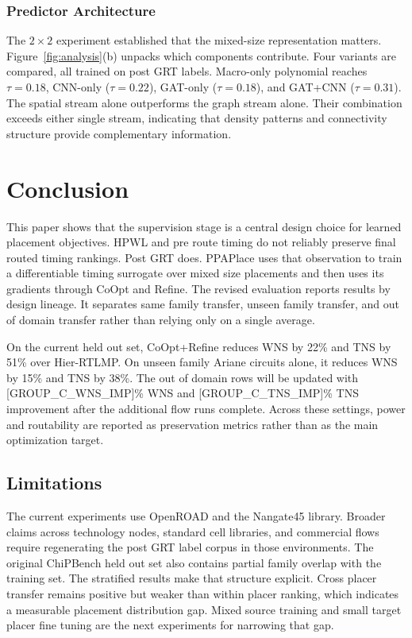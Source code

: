 \documentclass[sigconf,anonymous,review,9pt]{acmart}
\begin{document}
\subsubsection{Predictor Architecture}
\label{subsec:pred_results}

The $2 \times 2$ experiment established that the mixed-size
representation matters. Figure~\ref{fig:analysis}(b) unpacks which
components contribute. Four variants are compared, all trained on
post GRT labels. Macro-only polynomial reaches $\tau = 0.18$, CNN-only
($\tau = 0.22$), GAT-only ($\tau = 0.18$), and GAT+CNN
($\tau = 0.31$). The spatial stream alone outperforms the graph
stream alone. Their combination exceeds either single stream,
indicating that density patterns and connectivity structure provide
complementary information.


\section{Conclusion}
\label{sec:conclusion}

This paper shows that the supervision stage is a central design choice
for learned placement objectives. HPWL and pre route timing do not
reliably preserve final routed timing rankings. Post GRT does. PPAPlace
uses that observation to train a differentiable timing surrogate over
mixed size placements and then uses its gradients through CoOpt and
Refine. The revised evaluation reports results by design lineage. It
separates same family transfer, unseen family transfer, and out of
domain transfer rather than relying only on a single average.

On the current held out set, CoOpt{+}Refine reduces WNS by 22\% and TNS
by 51\% over Hier-RTLMP. On unseen family Ariane circuits alone, it
reduces WNS by 15\% and TNS by 38\%. The out of domain rows will be
updated with [GROUP_C_WNS_IMP]\% WNS and [GROUP_C_TNS_IMP]\% TNS
improvement after the additional flow runs complete. Across these
settings, power and routability are reported as preservation metrics
rather than as the main optimization target.

\subsection{Limitations}
\label{subsec:limitations}

The current experiments use OpenROAD and the Nangate45 library. Broader
claims across technology nodes, standard cell libraries, and commercial
flows require regenerating the post GRT label corpus in those
environments. The original ChiPBench held out set also contains partial
family overlap with the training set. The stratified results make that
structure explicit. Cross placer transfer remains positive but weaker
than within placer ranking, which indicates a measurable placement
distribution gap. Mixed source training and small target placer fine
tuning are the next experiments for narrowing that gap.

 
\newpage


\end{document}

